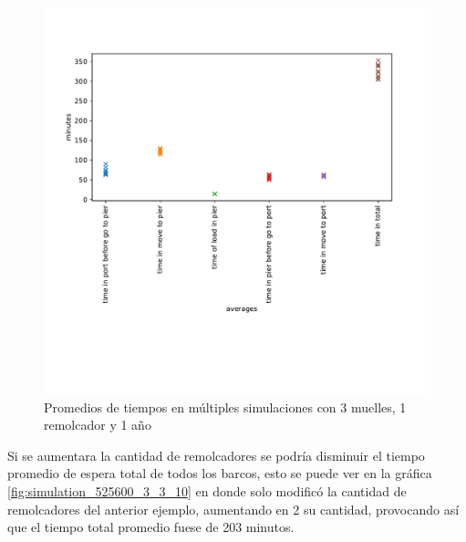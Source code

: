 \documentclass[titlepage,11pt]{scrartcl}
\begin{document}
	\begin{figure}[htb]
		\begin{center}
			\includegraphics[width=\columnwidth]{./figures/simulation_525600_3_1_10.pdf}
		\end{center}
		\caption{Promedios de tiempos en múltiples simulaciones con 3 muelles, 1 remolcador y 1 año \label{fig:simulation_525600_3_1_10}}
	\end{figure}
	
	Si se aumentara la cantidad de remolcadores se podría disminuir el tiempo promedio de espera total de todos los barcos, esto se puede ver en la gráfica \ref{fig:simulation_525600_3_3_10} en donde solo modificó la cantidad de remolcadores del anterior ejemplo, aumentando en 2 su cantidad, provocando así que el tiempo total promedio fuese de 203 minutos.
\end{document}
